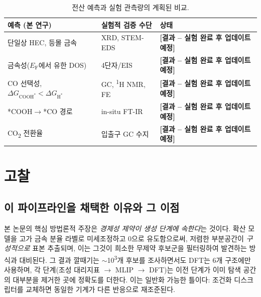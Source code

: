 \documentclass[11pt,a4paper]{report}
\newcommand{\tbu}[1]{\textcolor{red!70!black}{\textbf{[#1 -- 실험 완료 후 업데이트 예정]}}}
\newcommand{\dGH}{\Delta G_{\mathrm{H^*}}}
\newcommand{\dGCOOH}{\Delta G_{\mathrm{COOH^*}}}
\newcommand{\Ef}{E_\mathrm{F}}
\begin{document}
\begin{table}[t]
\centering
\caption{전산 예측과 실험 관측량의 계획된 비교.}
\label{tab:expt}
\small
\begin{tabular}{lll}
\toprule
예측 (본 연구) & 실험적 검증 수단 & 상태\\
\midrule
단일상 HEC, 등몰 금속 & XRD, STEM-EDS & \tbu{결과}\\
금속성($\Ef$에서 유한 DOS) & 4단자/EIS & \tbu{결과}\\
CO 선택성, $\dGCOOH<\dGH$ & GC, \textsuperscript{1}H NMR, FE & \tbu{결과}\\
*COOH$\rightarrow$*CO 경로 & in-situ FT-IR & \tbu{결과}\\
CO\textsubscript{2} 전환율 & 입출구 GC 수지 & \tbu{결과}\\
\bottomrule
\end{tabular}
\end{table}

\chapter{고찰}
\label{ch:discussion}

\section{이 파이프라인을 채택한 이유와 그 이점}
본 논문의 핵심 방법론적 주장은 \emph{경제성 제약이 생성 단계에 속한다}는 것이다. 확산 모델을 고가
금속 분율 라벨로 미세조정하고 0으로 유도함으로써, 저렴한 부분공간이 \emph{구성적으로} 표본
추출되며, 이는 그것이 희소한 무제약 후보군을 필터링하여 발견하는 방식과 대비된다. 그 결과 깔때기는
$\sim$10\textsuperscript{3}개 후보를 조사하면서도 DFT는 6개 구조에만 사용하며, 각 단계(조성 대리지표
$\rightarrow$ MLIP $\rightarrow$ DFT)는 이전 단계가 이미 탐색 공간의 대부분을 제거한 곳에 정확도를
더한다. 이는 일반화 가능한 틀이다: 조건화 디스크립터를 교체하면 동일한 기계가 다른 반응으로 재조준된다.
\end{document}
